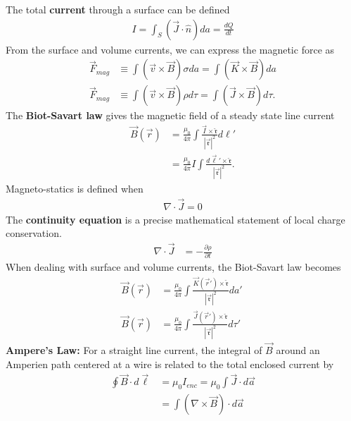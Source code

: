 \begin{multicols}{2}
The total \textbf{current} through a surface can be defined
\begin{align}
	I = \int_S (\vec{J}\cdot \hat{n})da = \frac{dQ}{dt} 
\end{align}
From the surface and volume currents, we can express the magnetic force as
\begin{align}
	\vec{F}_{mag} &\equiv \int (\vec{v}\times \vec{B})\sigma da = \int (\vec{K}\times \vec{B})da \\
	\vec{F}_{mag} &\equiv \int (\vec{v}\times \vec{B})\rho d\tau = \int (\vec{J}\times \vec{B})d\tau.
\end{align} 
The \textbf{Biot-Savart law} gives the magnetic field of a steady state line current
\begin{align}
	\vec{B}(\vec{r})&=\frac{\mu_0}{4\pi}\int \frac{\vec{I}\times \mathfrak{\hat{r}}}{|\vec{\mathfrak{r}}|^2}d\ell' \\ &=\frac{\mu_0}{4\pi}I\int \frac{d\vec{\ell}'\times \mathfrak{\hat{r}}}{|\vec{\mathfrak{r}}|^2}. 
\end{align}
Magneto-statics is defined when 
\begin{align}
	\nabla \cdot \vec{J} = 0
\end{align}
The \textbf{continuity equation} is a precise mathematical statement of local charge conservation.
\begin{align}
	\nabla \cdot \vec{J} &= -\frac{\partial \rho}{\partial t}
\end{align}
When dealing with surface and volume currents, the Biot-Savart law becomes
\begin{align}
	\vec{B}(\vec{r})&=\frac{\mu_0}{4\pi}\int \frac{\vec{K}(\vec{r}')\times \mathfrak{\hat{r}}}{|\vec{\mathfrak{r}}|^2}da'\ \\ \vec{B}(\vec{r})&=\frac{\mu_0}{4\pi}\int \frac{\vec{J}(\vec{r}')\times \mathfrak{\hat{r}}}{|\vec{\mathfrak{r}}|^2}d\tau'
\end{align}
\textbf{Ampere's Law:} For a straight line current, the integral of $\vec{B}$ around an Amperien path centered at a wire is related to the total enclosed current by
\begin{align}
	\oint\vec{B}\cdot d\vec{\ell} &= \mu_0 I_{enc} = \mu_0 \int \vec{J} \cdot d\vec{a} \\ &= \int (\nabla \times \vec{B})\cdot d\vec{a}
\end{align}
\end{multicols}
